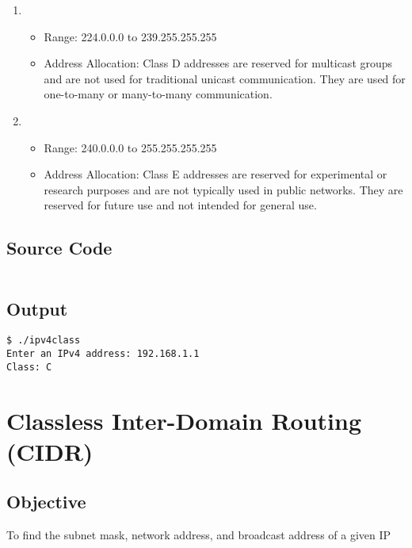 \documentclass{korigamik}
\begin{document}
\begin{enumerate}[label=\textbf{Class \Alph*:}, leftmargin=2cm]
	\item \begin{itemize}
		      \item Range: 224.0.0.0 to 239.255.255.255
          \item Address Allocation: Class D addresses are reserved for
            multicast groups and are not used for traditional unicast
            communication. They are used for one-to-many or many-to-many
            communication.
	      \end{itemize}
	      
	\item \begin{itemize}
		      \item Range: 240.0.0.0 to 255.255.255.255
          \item Address Allocation: Class E addresses are reserved for
            experimental or research purposes and are not typically used in
            public networks. They are reserved for future use and not intended
            for general use.
	      \end{itemize}
\end{enumerate}


\subsection{Source Code}

\inputminted[firstline=5, lastline=25, fontsize=\footnotesize]{cpp}{code/ipv4class.cpp}

\subsection{Output}

\begin{lstlisting}[style=output]
$ ./ipv4class
Enter an IPv4 address: 192.168.1.1
Class: C
\end{lstlisting}

\pagebreak

\section{Classless Inter-Domain Routing (CIDR)}
\label{sec:cidr}

\subsection{Objective}
To find the subnet mask, network address, and broadcast address of a given IP
\end{document}
